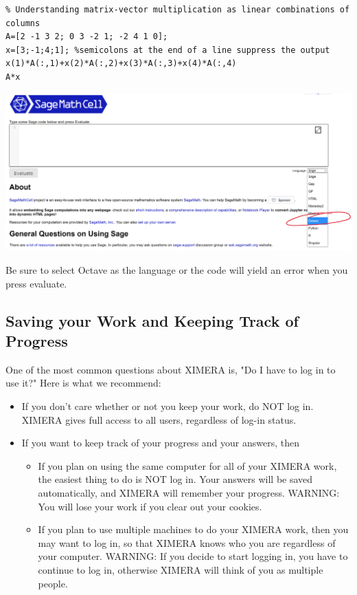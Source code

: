 \documentclass{ximera}
\begin{document}
\begin{verbatim}
% Understanding matrix-vector multiplication as linear combinations of columns
A=[2 -1 3 2; 0 3 -2 1; -2 4 1 0];
x=[3;-1;4;1]; %semicolons at the end of a line suppress the output
x(1)*A(:,1)+x(2)*A(:,2)+x(3)*A(:,3)+x(4)*A(:,4)
A*x
\end{verbatim} 

\begin{image}
\includegraphics{SageCell.jpg}
\end{image}

Be sure to select Octave as the language or the code will yield an error when you press evaluate.

\subsection*{Saving your Work and Keeping Track of Progress}
One of the most common questions about XIMERA is, "Do I have to log in to use it?"  Here is what we recommend:
\begin{itemize}
\item If you don't care whether or not you keep your work, do NOT log in.  XIMERA gives full access to all users, regardless of log-in status.
\item If you want to keep track of your progress and your answers, then
\begin{itemize}
\item If you plan on using the same computer for all of your XIMERA work, the easiest thing to do is NOT log in.  Your answers will be saved automatically, and XIMERA will remember your progress.  WARNING: You will lose your work if you clear out your cookies.
\item If you plan to use multiple machines to do your XIMERA work, then you may want to log in, so that XIMERA knows who you are regardless of your computer.  WARNING: If you decide to start logging in, you have to continue to log in, otherwise XIMERA will think of you as multiple people.
\end{itemize}
\end{itemize}
\end{document}
